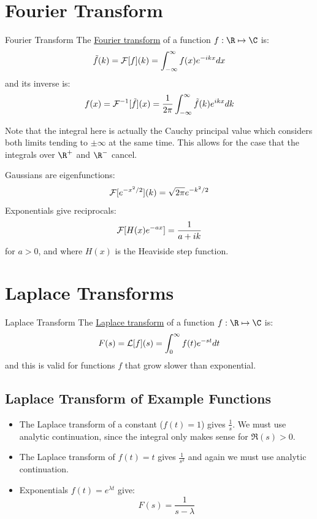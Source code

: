 \documentclass[../Main.tex]{subfiles}
\begin{document}
\section{Fourier Transform}
\begin{definition}{Fourier Transform}
    The \underline{Fourier transform} of a function $f : \R \mapsto \C$ is:
    \begin{equation*}
        \tilde{f}(k) = \mathcal{F}[f](k) = \int_{-\infty}^{\infty} f(x) e^{-ikx} dx 
    \end{equation*}
    and its inverse is:
    \begin{equation*}
        f(x) = \mathcal{F}^{-1}[\tilde{f}](x) = \frac{1}{2\pi} \int_{-\infty}^{\infty} \tilde{f}(k)e^{ikx} dk
    \end{equation*}
\end{definition}
Note that the integral here is actually the Cauchy principal value which considers both limits tending to $\pm \infty$ at the same time. This allows for the case that the integrals over $\R^+$ and $\R^-$ cancel.

Gaussians are eigenfunctions:
\begin{equation*}
    \mathcal{F}[e^{-x^2 / 2}](k) = \sqrt{2\pi} e^{-k^2 / 2}
\end{equation*}
Exponentials give reciprocals:
\begin{equation*}
    \mathcal{F}[H(x) e^{-ax}] = \frac{1}{a + ik}
\end{equation*}
for $a > 0$, and where $H(x)$ is the Heaviside step function.
\section{Laplace Transforms}
\begin{definition}{Laplace Transform}
    The \underline{Laplace transform} of a function $f : \R \mapsto \C$ is:
    \begin{equation*}
        F(s) = \mathcal{L}[f](s) = \int_{0}^{\infty} f(t)e^{-st} dt
    \end{equation*}
    and this is valid for functions $f$ that grow slower than exponential.
\end{definition}
\subsection{Laplace Transform of Example Functions}
\begin{itemize}
    \item The Laplace transform of a constant ($f(t) = 1$) gives $\frac1s$. We must use analytic continuation, since the integral only makes sense for $\Re(s) > 0$.
    \item The Laplace transform of $f(t) = t$ gives $\frac1{s^2}$ and again we must use analytic continuation.
    \item Exponentials $f(t) = e^{\lambda t}$ give:
    \begin{equation*}
        F(s) = \frac{1}{s - \lambda}
    \end{equation*}
\end{itemize}
\end{document}
